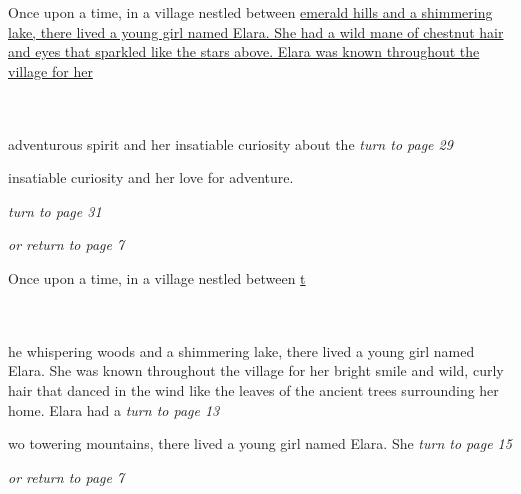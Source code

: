 \documentclass{memoir}
\begin{document}
        


        \hspace{1cm}\vfill
        \begin{minipage}{3in}
        \LARGE
        Once upon a time, in a village nestled between \ul{emerald hills and a shimmering lake, there lived a young girl named Elara. She had a wild mane of chestnut hair and eyes that sparkled like the stars above. Elara was known throughout the village for her}\\ \vspace{5mm} \\
  \\ 

        \hspace{1cm}\begin{minipage}{6cm}
        \normalsize
            adventurous spirit and her insatiable curiosity about the \hfill \textit{turn to page 29}\\ \vspace{5mm}

insatiable curiosity and her love for adventure.

 \hfill \textit{turn to page 31}\\ \vspace{5mm}

\hfill \textit{or return to page 7}
        \end{minipage} 
        \end{minipage}
        \hspace{1cm}\vfill
        \cleardoublepage

        


        \hspace{1cm}\vfill
        \begin{minipage}{3in}
        \LARGE
        Once upon a time, in a village nestled between \ul{t}\\ \vspace{5mm} \\
  \\ 

        \hspace{1cm}\begin{minipage}{6cm}
        \normalsize
            he whispering woods and a shimmering lake, there lived a young girl named Elara. She was known throughout the village for her bright smile and wild, curly hair that danced in the wind like the leaves of the ancient trees surrounding her home. Elara had a  \hfill \textit{turn to page 13}\\ \vspace{5mm}

wo towering mountains, there lived a young girl named Elara. She  \hfill \textit{turn to page 15}\\ \vspace{5mm}

\hfill \textit{or return to page 7}
        \end{minipage} 
        \end{minipage}
        \hspace{1cm}\vfill
        \cleardoublepage
\end{document}
